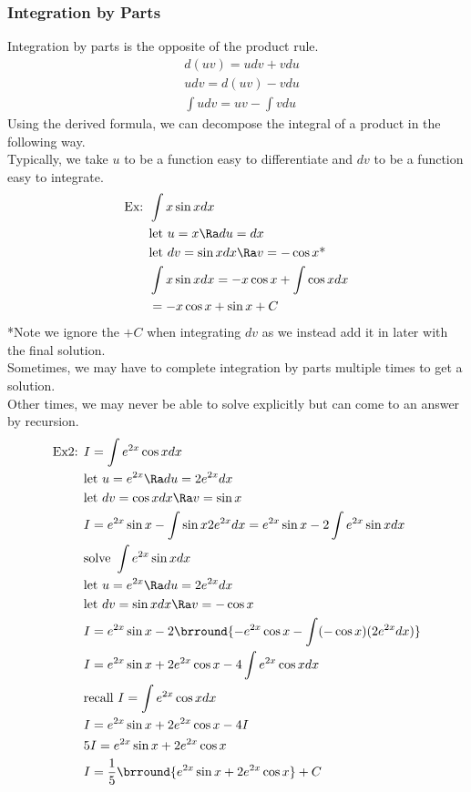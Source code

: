 \subsubsection{Integration by Parts}
Integration by parts is the opposite of the product rule.
\begin{align*}
    &d(uv)=udv+vdu\\
    &udv=d(uv)-vdu\\
    &\int udv=uv-\int vdu
\end{align*}
Using the derived formula, we can decompose the integral of a product in the following way.\\
Typically, we take $u$ to be a function easy to differentiate and $dv$ to be a function easy to integrate.
\begin{align*}
    \text{Ex: }&\int x\sin xdx\\
    &\text{let }u=x\Ra du=dx\\
    &\text{let }dv=\sin xdx\Ra v=-\cos x\text{*}\\
    &\int x\sin xdx=-x\cos x+\int \cos xdx\\
    &=-x\cos x+\sin x+C
\end{align*}
*Note we ignore the $+C$ when integrating $dv$ as we instead add it in later with the final solution.\\
Sometimes, we may have to complete integration by parts multiple times to get a solution.\\
Other times, we may never be able to solve explicitly but can come to an answer by recursion.
\begin{align*}
    \text{Ex2: }&I=\int e^{2x}\cos x dx\\
    &\text{let }u=e^{2x}\Ra du=2e^{2x}dx\\
    &\text{let }dv=\cos xdx\Ra v=\sin x\\
    &I=e^{2x}\sin x-\int \sin x2e^{2x}dx=e^{2x}\sin x-2\int e^{2x}\sin x dx\\
    &\text{solve }\int e^{2x}\sin xdx\\
    &\text{let }u=e^{2x}\Ra du=2e^{2x}dx\\
    &\text{let }dv=\sin xdx\Ra v=-\cos x\\
    &I=e^{2x}\sin x-2\brround{-e^{2x}\cos x-\int (-\cos x)(2e^{2x}dx)}\\
    &I=e^{2x}\sin x+2e^{2x}\cos x-4\int e^{2x}\cos xdx\\
    &\text{recall }I=\int e^{2x}\cos x dx\\
    &I=e^{2x}\sin x+2e^{2x}\cos x-4I\\
    &5I=e^{2x}\sin x+2e^{2x}\cos x\\
    &I=\frac{1}{5}\brround{e^{2x}\sin x+2e^{2x}\cos x}+C
\end{align*}
